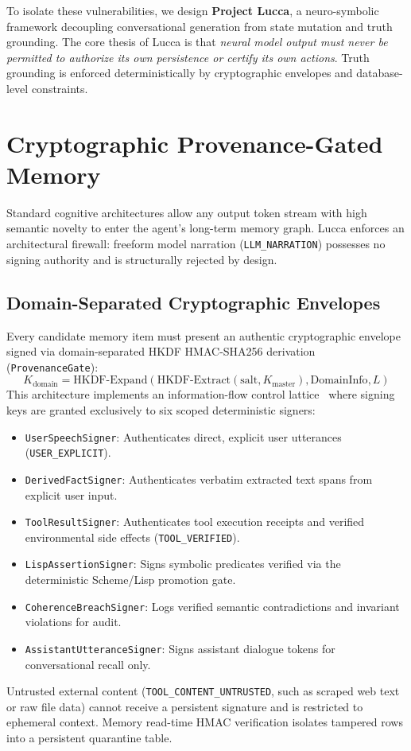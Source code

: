 \documentclass[10pt,twocolumn]{article}
\begin{document}
To isolate these vulnerabilities, we design \textbf{Project Lucca}, a neuro-symbolic framework decoupling conversational generation from state mutation and truth grounding. The core thesis of Lucca is that \textit{neural model output must never be permitted to authorize its own persistence or certify its own actions}. Truth grounding is enforced deterministically by cryptographic envelopes and database-level constraints.

\section{Cryptographic Provenance-Gated Memory}
Standard cognitive architectures allow any output token stream with high semantic novelty to enter the agent's long-term memory graph. Lucca enforces an architectural firewall: freeform model narration (\texttt{LLM\_NARRATION}) possesses no signing authority and is structurally rejected by design.

\subsection{Domain-Separated Cryptographic Envelopes}
Every candidate memory item must present an authentic cryptographic envelope signed via domain-separated HKDF HMAC-SHA256 derivation~\cite{krawczyk2010hkdf} (\texttt{ProvenanceGate}):
\begin{equation}
  K_{\text{domain}} = \text{HKDF-Expand}(\text{HKDF-Extract}(\text{salt}, K_{\text{master}}), \text{DomainInfo}, L)
\end{equation}
This architecture implements an information-flow control lattice~\cite{denning1976lattice} where signing keys are granted exclusively to six scoped deterministic signers:
\begin{itemize}
    \item \texttt{UserSpeechSigner}: Authenticates direct, explicit user utterances (\texttt{USER\_EXPLICIT}).
    \item \texttt{DerivedFactSigner}: Authenticates verbatim extracted text spans from explicit user input.
    \item \texttt{ToolResultSigner}: Authenticates tool execution receipts and verified environmental side effects (\texttt{TOOL\_VERIFIED}).
    \item \texttt{LispAssertionSigner}: Signs symbolic predicates verified via the deterministic Scheme/Lisp promotion gate.
    \item \texttt{CoherenceBreachSigner}: Logs verified semantic contradictions and invariant violations for audit.
    \item \texttt{AssistantUtteranceSigner}: Signs assistant dialogue tokens for conversational recall only.
\end{itemize}
Untrusted external content (\texttt{TOOL\_CONTENT\_UNTRUSTED}, such as scraped web text or raw file data) cannot receive a persistent signature and is restricted to ephemeral context. Memory read-time HMAC verification isolates tampered rows into a persistent quarantine table.
\end{document}
